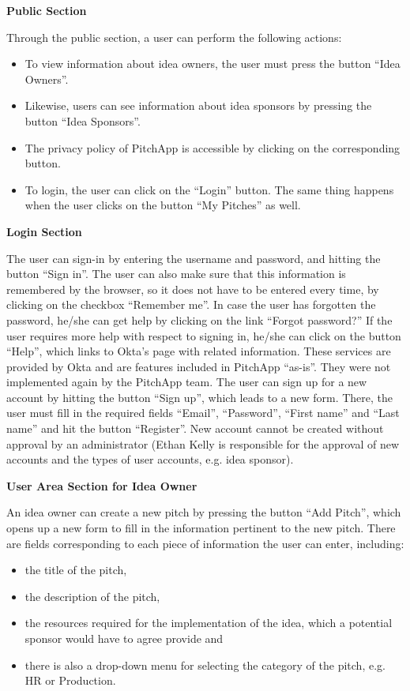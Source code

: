 \textbf{Public Section}

Through the public section, a user can perform the following actions:

\begin{itemize}

\item To view information about idea owners, the user must press the button “Idea Owners”.
\item Likewise, users can see information about idea sponsors by pressing the button “Idea Sponsors”.
\item The privacy policy of PitchApp is accessible by clicking on the corresponding button.
\item To login, the user can click on the “Login” button. The same thing happens when the user clicks on the button “My Pitches” as well.

\end{itemize}

\textbf{Login Section}

The user can sign-in by entering the username and password, and hitting the button “Sign in”.
The user can also make sure that this information is remembered by the browser, so it does not have to be entered every time, by clicking on the checkbox “Remember me”.
In case the user has forgotten the password, he/she can get help by clicking on the link “Forgot password?”
If the user requires more help with respect to signing in, he/she can click on the button “Help”, which links to Okta’s page with related information.
These services are provided by Okta and are features included in PitchApp “as-is”. They were not implemented again by the PitchApp team.
The user can sign up for a new account by hitting the button “Sign up”, which leads to a new form. There, the user must fill in the required fields “Email”, “Password”, “First name” and “Last name” and hit the button “Register”.
New account cannot be created without approval by an administrator (Ethan Kelly is responsible for the approval of new accounts and the types of user accounts, e.g. idea sponsor).


\textbf{User Area Section for Idea Owner}

An idea owner can create a new pitch by pressing the button “Add Pitch”, which opens up a new form to fill in the information pertinent to the new pitch. There are fields corresponding to each piece of information the user can enter, including:

\begin{itemize}
\item the title of the pitch,
\item the description of the pitch,
\item the resources required for the implementation of the idea, which a potential sponsor would have to agree provide and
\item there is also a drop-down menu for selecting the category of the pitch, e.g. HR or Production.
\end{itemize}

